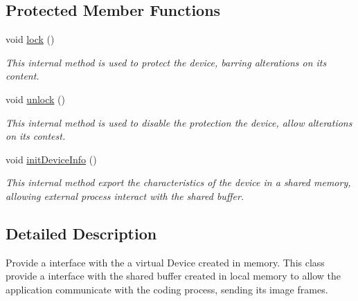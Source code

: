 \subsection*{Protected Member Functions}
\begin{DoxyCompactItemize}
\item 
void \hyperlink{classbr_1_1ufscar_1_1lince_1_1xpta_1_1streaming_1_1DeviceInterface_ab8de766460c25e220e6a83f163775960}{lock} ()
\begin{DoxyCompactList}\small\item\em This internal method is used to protect the device, barring alterations on its content. \item\end{DoxyCompactList}\item 
void \hyperlink{classbr_1_1ufscar_1_1lince_1_1xpta_1_1streaming_1_1DeviceInterface_a2bf3b1a64cf40a9f7e6bad2908a53e9c}{unlock} ()
\begin{DoxyCompactList}\small\item\em This internal method is used to disable the protection the device, allow alterations on its contest. \item\end{DoxyCompactList}\item 
void \hyperlink{classbr_1_1ufscar_1_1lince_1_1xpta_1_1streaming_1_1DeviceInterface_aabfb7ff2502e61a58985a8d0a5d344a3}{initDeviceInfo} ()
\begin{DoxyCompactList}\small\item\em This internal method export the characteristics of the device in a shared memory, allowing external process interact with the shared buffer. \item\end{DoxyCompactList}\end{DoxyCompactItemize}


\subsection{Detailed Description}
Provide a interface with the a virtual Device created in memory. This class provide a interface with the shared buffer created in local memory to allow the application communicate with the coding process, sending its image frames. 

